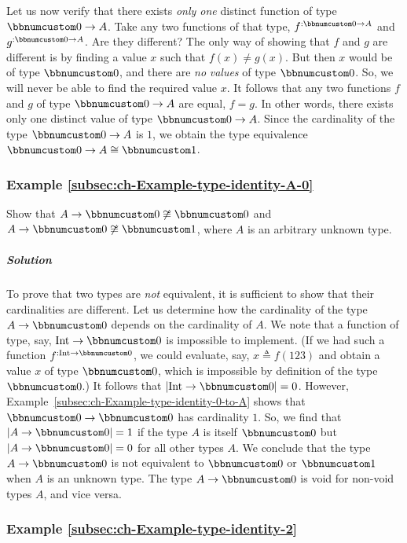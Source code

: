 Let us now verify that there exists \emph{only one} distinct function
of type $\bbnum 0\rightarrow A$. Take any two functions of that type,
$f^{:\bbnum 0\rightarrow A}$ and $g^{:\bbnum 0\rightarrow A}$. Are
they different? The only way of showing that $f$ and $g$ are different
is by finding a value $x$ such that $f(x)\neq g(x)$. But then $x$
would be of type $\bbnum 0$, and there are \emph{no} \emph{values}
of type $\bbnum 0$. So, we will never be able to find the required
value $x$. It follows that any two functions $f$ and $g$ of type
$\bbnum 0\rightarrow A$ are equal, $f=g$. In other words, there
exists only one distinct value of type $\bbnum 0\rightarrow A$. Since
the cardinality of the type $\bbnum 0\rightarrow A$ is $1$, we obtain
the type equivalence $\bbnum 0\rightarrow A\cong\bbnum 1$.

\subsubsection{Example \label{subsec:ch-Example-type-identity-A-0}\ref{subsec:ch-Example-type-identity-A-0}}

Show that $A\rightarrow\bbnum 0\not\cong\bbnum 0$ and $A\rightarrow\bbnum 0\not\cong\bbnum 1$,
where $A$ is an arbitrary unknown type.

\subparagraph{Solution}

To prove that two types are \emph{not} equivalent, it is sufficient
to show that their cardinalities are different. Let us determine how
the cardinality of the type $A\rightarrow\bbnum 0$ depends on the
cardinality of $A$. We note that a function of type, say, $\text{Int}\rightarrow\bbnum 0$
is impossible to implement. (If we had such a function $f^{:\text{Int}\rightarrow\bbnum 0}$,
we could evaluate, say, $x\triangleq f(123)$ and obtain a value $x$
of type $\bbnum 0$, which is impossible by definition of the type
$\bbnum 0$.) It follows that $\left|\text{Int}\rightarrow\bbnum 0\right|=0$.
However, Example~\ref{subsec:ch-Example-type-identity-0-to-A} shows
that $\bbnum 0\rightarrow\bbnum 0$ has cardinality $1$. So, we find
that $\left|A\rightarrow\bbnum 0\right|=1$ if the type $A$ is itself
$\bbnum 0$ but $\left|A\rightarrow\bbnum 0\right|=0$ for all other
types $A$. We conclude that the type $A\rightarrow\bbnum 0$ is not
equivalent to $\bbnum 0$ or $\bbnum 1$ when $A$ is an unknown type.
The type $A\rightarrow\bbnum 0$ is void for non-void types $A$,
and vice versa.

\subsubsection{Example \label{subsec:ch-Example-type-identity-2}\ref{subsec:ch-Example-type-identity-2}}

